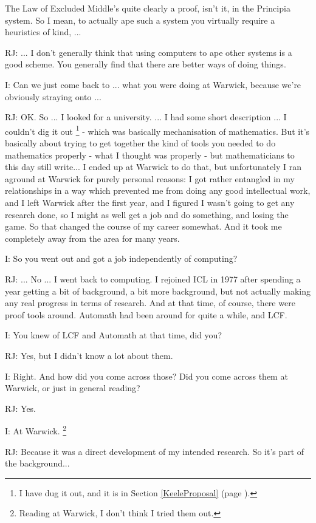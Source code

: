\documentclass[10pt,titlepage]{book}
\begin{document}
The Law of Excluded Middle's quite clearly a proof, isn't it, in the Principia system.
So I mean, to actually ape such a system you virtually require a heuristics of kind, ...

RJ: ... I don't generally think that using computers to ape other systems is a good scheme.
You generally find that there are better ways of doing things.

I: Can we just come back to ... what you were doing at Warwick, because we're obviously straying onto ...

RJ: OK.
So ... I looked for a university.
... I had some short description ... I couldn't dig it out%
\footnote{
I have dug it out, and it is in Section \ref{KeeleProposal} (page \pageref{KeeleProposal}).
}%
 - which was basically mechanisation of mathematics.
But it's basically about trying to get together the kind of tools you needed to do mathematics properly - what I thought was properly - but mathematicians to this day still write...
I ended up at Warwick to do that, but unfortunately I ran aground at Warwick for purely personal reasons: I got rather entangled in my relationships in a way which prevented me from doing any good intellectual work, and I left Warwick after the first year, and I figured I wasn't going to get any research done, so I might as well get a job and do something, and losing the game.
So that changed the course of my career somewhat.
And it took me completely away from the area for many years.

I: So you went out and got a job independently of computing?

RJ: ... No ... I went back to computing.
I rejoined ICL in 1977 after spending a year getting a bit of background, a bit more background, but not actually making any real progress in terms of research.
And at that time, of course, there were proof tools around.
Automath had been around for quite a while, and LCF.

I: You knew of LCF and Automath at that time, did you?

RJ: Yes, but I didn't know a lot about them.

I: Right.
And how did you come across those?
Did you come across them at Warwick, or just in general reading?

RJ: Yes.

I: At Warwick.%
\footnote{
Reading at Warwick, I don't think I tried them out.
}%

RJ: Because it was a direct development of my intended research.
So it's part of the background...
\end{document}
